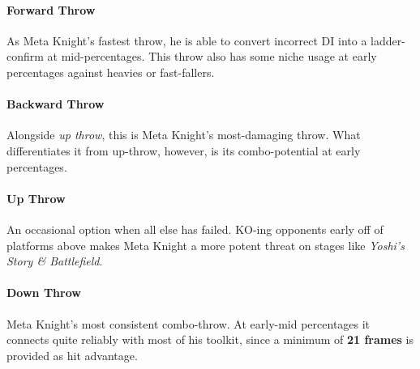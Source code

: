 \paragraph{Forward Throw}
As Meta Knight's fastest throw, he is able to convert incorrect DI into a ladder-confirm at mid-percentages. This throw also has some niche usage at early percentages against heavies or fast-fallers.
\paragraph{Backward Throw}
Alongside \textit{up throw}, this is Meta Knight's most-damaging throw. What differentiates it from up-throw, however, is its combo-potential at early percentages.
\paragraph{Up Throw}
An occasional option when all else has failed. KO-ing opponents early off of platforms above makes Meta Knight a more potent threat on stages like \textit{Yoshi's Story \& Battlefield}.
\paragraph{Down Throw}
Meta Knight's most consistent combo-throw. At early-mid percentages it connects quite reliably with most of his toolkit, since a minimum of \textbf{21 frames} is provided as hit advantage.